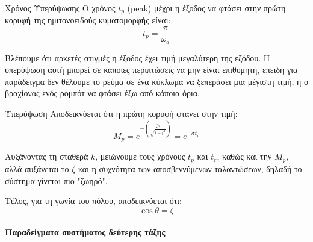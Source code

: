 \documentclass[11pt,a4paper,notitlepage,fleqn,draft]{article}
\begin{document}
\begin{itemize}
	\begin{defn}{Χρόνος Υπερύψωσης}{}
	Ο χρόνος \( t_p \) (peak) μέχρι η έξοδος να φτάσει στην πρώτη κορυφή της ημιτονοειδούς κυματομορφής είναι:
	\[
	\boxed{t_p = \frac{π}{\omega_d}}
	\]
	\end{defn}
	
	Βλέπουμε ότι αρκετές στιγμές η έξοδος έχει τιμή μεγαλύτερη της εξόδου. Η υπερύψωση αυτή
	μπορεί σε κάποιες περιπτώσεις να μην είναι επιθυμητή, επειδή για παράδειγμα δεν θέλουμε
	το ρεύμα σε ένα κύκλωμα να ξεπεράσει μια μέγιστη τιμή, ή ο βραχίονας ενός ρομπότ να
	φτάσει έξω από κάποια όρια.
	
	\begin{defn}{Υπερύψωση}{}
		Αποδεικνύεται ότι η πρώτη κορυφή φτάνει στην τιμή:
		\[
		M_p =
		e^{-\left(
			\frac{ζπ}{\sqrt{1-ζ^2}}
			\right)}
		= e^{-σ t_p}
		\]
	\end{defn}
	
	Αυξάνοντας τη σταθερά \( k \), μειώνουμε τους χρόνους \( t_p \) και \( t_r \), καθώς και την \( M_p \),
	αλλά αυξάνεται το \( ζ \) και η συχνότητα των αποσβεννύμενων ταλαντώσεων, δηλαδή το σύστημα γίνεται πιο "ζωηρό".
	
	Τέλος, για τη γωνία του πόλου, αποδεικνύεται ότι:
	\[
	\boxed{\cos θ = ζ}
	\]
\end{itemize}
	
\paragraph{Παραδείγματα συστήματος δεύτερης τάξης} \hspace{0pt}
\end{document}
